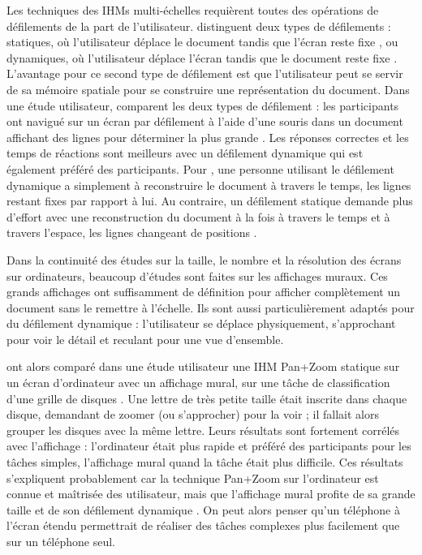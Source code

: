 Les techniques des IHMs multi-échelles requièrent toutes des opérations de défilements de la part de l'utilisateur. \cite{Mehra2006} distinguent deux types de défilements : statiques, où l'utilisateur déplace le document tandis que l'écran reste fixe , ou dynamiques, où l'utilisateur déplace l'écran tandis que le document reste fixe . L'avantage pour ce second type de défilement est que l'utilisateur peut se servir de sa mémoire spatiale pour se construire une représentation du document. Dans une étude utilisateur, \citeauthor{Mehra2006} comparent les deux types de défilement : les participants ont navigué sur un écran par défilement à l'aide d'une souris dans un document affichant des lignes pour déterminer la plus grande . Les réponses correctes et les temps de réactions sont meilleurs avec un défilement dynamique qui est également préféré des participants. Pour \citeauthor{Mehra2006}, une personne utilisant le défilement dynamique a simplement à reconstruire le document à travers le temps, les lignes restant fixes par rapport à lui. Au contraire, un défilement statique demande plus d'effort avec une reconstruction du document à la fois à travers le temps et à travers l'espace, les lignes changeant de positions .

Dans la continuité des études sur la taille, le nombre et la résolution des écrans sur ordinateurs, beaucoup d'études sont faites sur les affichages muraux. Ces grands affichages ont suffisamment de définition pour afficher complètement un document sans le remettre à l'échelle. Ils sont aussi particulièrement adaptés pour du défilement dynamique : l'utilisateur se déplace physiquement, s'approchant pour voir le détail et reculant pour une vue d'ensemble.


\cite{Liu2014} ont alors comparé dans une étude utilisateur une IHM Pan+Zoom statique sur un écran d'ordinateur avec un affichage mural, sur une tâche de classification d'une grille de disques . Une lettre de très petite taille était inscrite dans chaque disque, demandant de zoomer (ou s'approcher) pour la voir ; il fallait alors grouper les disques avec la même lettre. Leurs résultats sont fortement corrélés avec l'affichage : l'ordinateur était plus rapide et préféré des participants pour les tâches simples, l'affichage mural quand la tâche était plus difficile. Ces résultats s'expliquent probablement car la technique Pan+Zoom sur l'ordinateur est connue et maîtrisée des utilisateur, mais que l'affichage mural profite de sa grande taille \citep{Czerwinski2003} et de son défilement dynamique \citep{Mehra2006}. On peut alors penser qu'un téléphone à l'écran étendu permettrait de réaliser des tâches complexes plus facilement que sur un téléphone seul.

